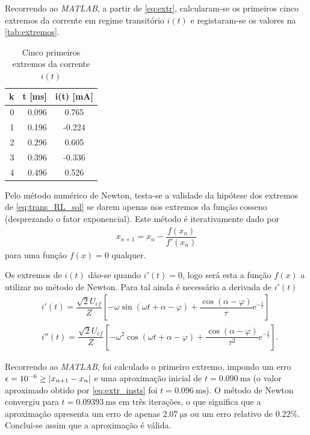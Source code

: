 \documentclass[a4paper, titlepage, portuguese]{article}
\newcommand\e{\mathrm{e} }
\begin{document}
	\subsubsection{}
	\par
	Recorrendo ao \textit{MATLAB}, a partir de \eqref{eq:extr}, calcularam-se os primeiros cinco extremos da corrente em regime transitório $i(t)$ e registaram-se os valores na \autoref{tab:extremos}.
	\begin{table}[H]
		\centering
		\caption{Cinco primeiros extremos da corrente $i(t)$}
		\label{tab:extremos}
		\begin{tabular}{| r | r | S |}
			\hline
			\textbf{k} & \textbf{t} [\si{\milli\second}] & \textbf{i(t)} [\si{\milli\ampere}] \\
			 & 0.096 & 0.765 \\
			1 & 0.196 & -0.224 \\
			2 & 0.296 & 0.605 \\
			3 & 0.396 & -0.336 \\
			4 & 0.496 & 0.526 \\
			\hline
		\end{tabular}
	\end{table}
	\par
	Pelo método numérico de Newton, testa-se a validade da hipótese dos extremos de \eqref{eq:trans_RL_sol} se darem apenas nos extremos da função cosseno (desprezando o fator exponencial). Este método é iterativamente dado por
	\begin{align*}
		x_{n+1} = x_n - \dfrac{f(x_n)}{f'(x_n)}
	\end{align*}
	para uma função $f(x) = 0$ qualquer. \\
	\par
	Os extremos de $i(t)$ dão-se quando $i'(t) = 0$, logo será esta a função $f(x)$ a utilizar no método de Newton. Para tal ainda é necessário a derivada de $i'(t)$
	\begin{align*}
		&i'(t) = \dfrac{\sqrt{2}U_{ef}}{Z} \left[-\omega \sin\left(\omega t + \alpha - \varphi\right) + \dfrac{\cos\left(\alpha - \varphi\right)}{\tau}\e^{-\frac{t}{\tau}}\right] \\
		&i''(t) = \dfrac{\sqrt{2}U_{ef}}{Z} \left[-\omega^2 \cos\left(\omega t + \alpha - \varphi\right) + \dfrac{\cos\left(\alpha - \varphi\right)}{\tau^2}\e^{-\frac{t}{\tau}}\right].
	\end{align*}
	\par
	Recorrendo ao \textit{MATLAB}, foi calculado o primeiro extremo, impondo um erro $\epsilon = \num{e-6} \geq \abs{x_{n+1} - x_n}$ e uma aproximação inicial de $t = \SI{0.090}{\milli\second}$ (o valor aproximado obtido por \eqref{eq:extr_insts} foi $t = \SI{0.096}{\milli\second}$). O método de Newton convergiu para $t = \SI{0.09393}{\milli\second}$ em três iterações, o que significa que a aproximação apresenta um erro de apenas $\SI{2.07}{\micro\second}$ ou um erro relativo de $0.22\%$. Conclui-se assim que a aproximação é válida.
\end{document}
